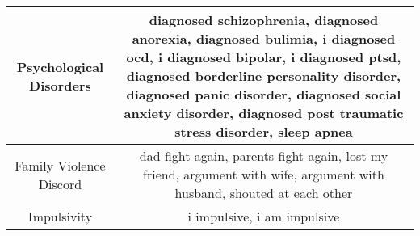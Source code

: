 \documentclass[11pt]{article}
\begin{document}
\begin{table*}
\begin{tabulary}{500pt}{|C|C|}
   Psychological Disorders               & diagnosed schizophrenia, diagnosed anorexia, diagnosed bulimia, i diagnosed ocd, i diagnosed bipolar, i diagnosed ptsd, diagnosed borderline personality disorder, diagnosed panic disorder, diagnosed social anxiety disorder, diagnosed post traumatic stress disorder, sleep apnea                                                                                                                                                                                                                                                                                                                                                                                                                                                                                                                                                     \\ \hline
   Family Violence Discord               & dad fight again, parents fight again, lost my friend, argument with wife, argument with husband, shouted at each other                                                                                                                                                                                                                                                                                                                                                                                                                                                                                                                                                                                                                                                                                                                    \\ \hline
   Impulsivity                           & i impulsive, i am impulsive                                                                                                                                                                                                                                                                                                                                                                                                                                                                                                                                                                                                                                                                                                                                                                                                               \\ \hline

\end{tabulary}
\end{table*}
\end{document}
